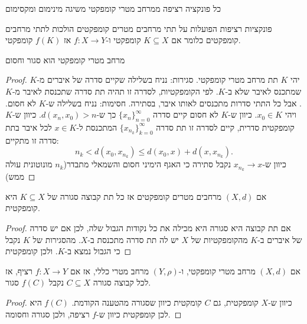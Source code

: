 \documentclass{tstextbook}
\begin{document}
\begin{proposition}
כל פונקציה רציפה ממרחב מטרי קומפקטי משיגה מינימום ומקסימום

\end{proposition}
\begin{proposition}
פונקציות רציפות הפועלות על תתי מרחבים מטרים קומפקטים הולכות לתתי מרחבים קומפקטים כלומר אם \(K\subseteq X\) קומפקטי ו-\(f:X\to Y\) אז \(f(K)\) קומפקטי.

\end{proposition}
\begin{proposition}
מרחב מטרי קומפקטי הוא סגור וחסום

\end{proposition}
\begin{proof}
יהי \(K\) תת מרחב מטרי קומפקטי.
סגירות: נניח בשלילה שקיים סדרה של איברים מ-\(K\) שמתכנס לאיבר שלא ב-\(K\). לפי הקומפקטיות, לסדרה זו תהיה תת סדרה שתכנסת לאיבר מ-\(K\). אבל כל התתי סדרות מתכנסים לאותו איבר, בסתירה.
חסימות: נניח בשלילה ש-\(K\) לא חסום. ויהי \(x_{0}\in K\). כיוון ש-\(K\) לא חסום קיים סדרה \(\{ x_n\}_{n=0}^{\infty}\)  כך ש-\(d(x_{n},x_{0})>n\). כיוון ש-\(K\) קומפקטית סדרית, קיים לסדרה זו תת סדרה \(\{ x_{n_{k}}\}_{k=0}^{\infty}\)  המתכנסת ל-\(x \in K\) לכל איבר בתת סדרה זו מתקיים:
$$n_{k}<d(x_{0},x_{n_{k}})\leq d(x_{0},x)+d(x,x_{n_{k}}).$$
כיוון ש-\(x_{n_{k}}\to x\) נקבל סתירה כי האגף הימיני חסום והשמאלי מתבדר(\(n_{k}\) מונוטונית עולה ממש)

\end{proof}
\begin{proposition}
אם \((X,d)\) מרחבים מטרים קומפקטים אז כל תת קבוצה סגורה של \(K\subseteq X\) היא קומפקטית.

\end{proposition}
\begin{proof}
אם תת קבוצה היא סגורה היא מכילה את כל נקודות הגבול שלה, לכן אם יש סדרה של איברים ב-\(K\) מהקומפקטיות של \(X\) יש לה תת סדרה מתכנסת ב-\(X\). מהסגירות של \(K\) נקבל כי הגבול נמצא ב-\(K\). ולכן קומפקטית 

\end{proof}
\begin{corollary}
אם \((X,d)\) מרחב מטרי קומפקטי, ו-\(\left( Y,\rho \right)\) מרחב מטרי כללי, אז אם \(f:X\to Y\) רציף, אז לכל קבוצה סגורה \(C\subseteq X\) נקבל \(f(C)\) סגור.

\end{corollary}
\begin{proof}
כיוון ש-\(X\) קומפקטית, גם \(C\) קומקטית כיוון שסגורה מהטענה הקודמת. \(f(C)\) היא לכן קומפקטית כיוון ש-\(f\) רציפה, ולכן סגורה וחסומה. 

\end{proof}
\end{document}
